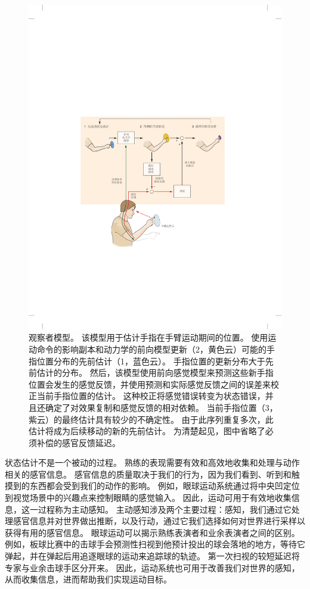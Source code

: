 \begin{figure}[htbp]
	\centering
	\includegraphics[width=0.9\linewidth]{chap30/fig_30_5}
	\caption{观察者模型。
		该模型用于估计手指在手臂运动期间的位置。
		使用运动命令的影响副本和动力学的前向模型更新（2，黄色云）可能的手指位置分布的先前估计（1，蓝色云）。
		手指位置的更新分布大于先前估计的分布。
		然后，该模型使用前向感觉模型来预测这些新手指位置会发生的感觉反馈，并使用预测和实际感觉反馈之间的误差来校正当前手指位置的估计。
		这种校正将感觉错误转变为状态错误，并且还确定了对效果复制和感觉反馈的相对依赖。
		当前手指位置（3，紫云）的最终估计具有较少的不确定性。
		由于此序列重复多次，此估计将成为后续移动的新的先前估计。
		为清楚起见，图中省略了必须补偿的感官反馈延迟。}
	\label{fig:30_5}
\end{figure}


状态估计不是一个被动的过程。
熟练的表现需要有效和高效地收集和处理与动作相关的感官信息。
感官信息的质量取决于我们的行为，因为我们看到、听到和触摸到的东西都会受到我们的动作的影响。
例如，眼球运动系统通过将中央凹定位到视觉场景中的兴趣点来控制眼睛的感觉输入。
因此，运动可用于有效地收集信息，这一过程称为主动感知。
主动感知涉及两个主要过程：感知，我们通过它处理感官信息并对世界做出推断，以及行动，通过它我们选择如何对世界进行采样以获得有用的感官信息。
眼球运动可以揭示熟练表演者和业余表演者之间的区别。
例如，板球比赛中的击球手会预测性扫视到他预计投出的球会落地的地方，等待它弹起，并在弹起后用追逐眼球的运动来追踪球的轨迹。
第一次扫视的较短延迟将专家与业余击球手区分开来。
因此，运动系统也可用于改善我们对世界的感知，从而收集信息，进而帮助我们实现运动目标。



